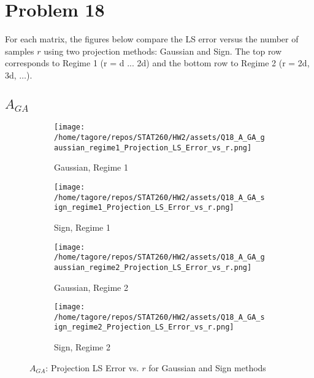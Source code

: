 \documentclass{article}
\begin{document}
\section*{Problem 18}


For each matrix, the figures below compare the LS error versus the number of samples \(r\) using two projection methods: Gaussian and Sign. The top row corresponds to Regime 1 (r = d ... 2d) and the bottom row to Regime 2 (r = 2d, 3d, \(\ldots\)).

\subsection*{\(A_{GA}\)}

\begin{figure}[H]
    \centering
    \begin{subfigure}[b]{0.48\textwidth}
        \centering
        \texttt{[image: /home/tagore/repos/STAT260/HW2/assets/Q18\_A\_GA\_gaussian\_regime1\_Projection\_LS\_Error\_vs\_r.png]}
        \caption{Gaussian, Regime 1}
        \label{fig:GA_gaussian_regime1}
    \end{subfigure}
    \hfill
    \begin{subfigure}[b]{0.48\textwidth}
        \centering
        \texttt{[image: /home/tagore/repos/STAT260/HW2/assets/Q18\_A\_GA\_sign\_regime1\_Projection\_LS\_Error\_vs\_r.png]}
        \caption{Sign, Regime 1}
        \label{fig:GA_sign_regime1}
    \end{subfigure}
    
    \vspace{0.5cm}
    
    \begin{subfigure}[b]{0.48\textwidth}
        \centering
        \texttt{[image: /home/tagore/repos/STAT260/HW2/assets/Q18\_A\_GA\_gaussian\_regime2\_Projection\_LS\_Error\_vs\_r.png]}
        \caption{Gaussian, Regime 2}
        \label{fig:GA_gaussian_regime2}
    \end{subfigure}
    \hfill
    \begin{subfigure}[b]{0.48\textwidth}
        \centering
        \texttt{[image: /home/tagore/repos/STAT260/HW2/assets/Q18\_A\_GA\_sign\_regime2\_Projection\_LS\_Error\_vs\_r.png]}
        \caption{Sign, Regime 2}
        \label{fig:GA_sign_regime2}
    \end{subfigure}
    
    \caption{\(A_{GA}\): Projection LS Error vs. \(r\) for Gaussian and Sign methods}
    \label{fig:GA_projection_comparison}
\end{figure}
\end{document}
